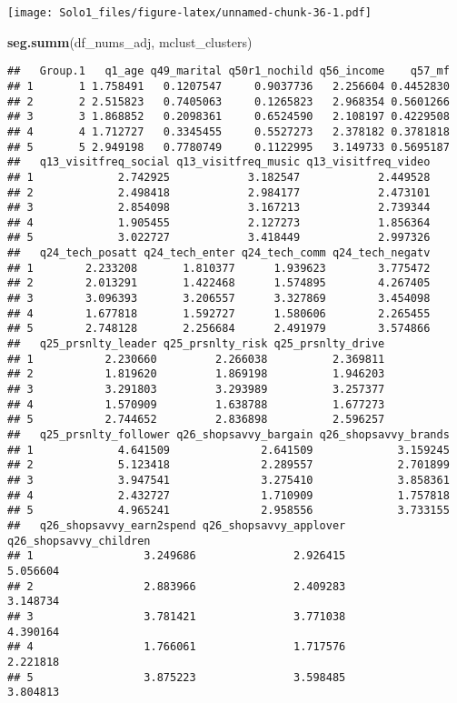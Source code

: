 \documentclass[]{article}
\newenvironment{Shaded}{\begin{snugshade}}{\end{snugshade}}
\newcommand{\KeywordTok}[1]{\textcolor[rgb]{0.13,0.29,0.53}{\textbf{#1}}}
\newcommand{\NormalTok}[1]{#1}
\begin{document}
\texttt{[image: Solo1\_files/figure-latex/unnamed-chunk-36-1.pdf]}

\begin{Shaded}
\begin{Highlighting}[]
\KeywordTok{seg.summ}\NormalTok{(df_nums_adj, mclust_clusters)}
\end{Highlighting}
\end{Shaded}

\begin{verbatim}
##   Group.1   q1_age q49_marital q50r1_nochild q56_income    q57_mf
## 1       1 1.758491   0.1207547     0.9037736   2.256604 0.4452830
## 2       2 2.515823   0.7405063     0.1265823   2.968354 0.5601266
## 3       3 1.868852   0.2098361     0.6524590   2.108197 0.4229508
## 4       4 1.712727   0.3345455     0.5527273   2.378182 0.3781818
## 5       5 2.949198   0.7780749     0.1122995   3.149733 0.5695187
##   q13_visitfreq_social q13_visitfreq_music q13_visitfreq_video
## 1             2.742925            3.182547            2.449528
## 2             2.498418            2.984177            2.473101
## 3             2.854098            3.167213            2.739344
## 4             1.905455            2.127273            1.856364
## 5             3.022727            3.418449            2.997326
##   q24_tech_posatt q24_tech_enter q24_tech_comm q24_tech_negatv
## 1        2.233208       1.810377      1.939623        3.775472
## 2        2.013291       1.422468      1.574895        4.267405
## 3        3.096393       3.206557      3.327869        3.454098
## 4        1.677818       1.592727      1.580606        2.265455
## 5        2.748128       2.256684      2.491979        3.574866
##   q25_prsnlty_leader q25_prsnlty_risk q25_prsnlty_drive
## 1           2.230660         2.266038          2.369811
## 2           1.819620         1.869198          1.946203
## 3           3.291803         3.293989          3.257377
## 4           1.570909         1.638788          1.677273
## 5           2.744652         2.836898          2.596257
##   q25_prsnlty_follower q26_shopsavvy_bargain q26_shopsavvy_brands
## 1             4.641509              2.641509             3.159245
## 2             5.123418              2.289557             2.701899
## 3             3.947541              3.275410             3.858361
## 4             2.432727              1.710909             1.757818
## 5             4.965241              2.958556             3.733155
##   q26_shopsavvy_earn2spend q26_shopsavvy_applover q26_shopsavvy_children
## 1                 3.249686               2.926415               5.056604
## 2                 2.883966               2.409283               3.148734
## 3                 3.781421               3.771038               4.390164
## 4                 1.766061               1.717576               2.221818
## 5                 3.875223               3.598485               3.804813
\end{verbatim}
\end{document}
